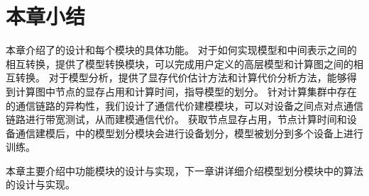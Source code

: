 \section{本章小结}
本章介绍了\sys{}的设计和每个模块的具体功能。
对于如何实现模型和中间表示之间的相互转换，\sys{}提供了模型转换模块，可以完成用户定义的高层模型和计算图之间的相互转换。
对于模型分析，\sys{}提供了显存代价估计方法和计算代价分析方法，能够得到计算图中节点的显存占用和计算时间，指导模型的划分。
针对计算集群中存在的通信链路的异构性，我们设计了通信代价建模模块，可以对设备之间点对点通信链路进行带宽测试，从而建模通信代价。
获取节点显存占用，节点计算时间和设备通信建模后，\sys{}中的模型划分模块会进行设备划分，模型被划分到多个设备上进行训练。

本章主要介绍\sys{}中功能模块的设计与实现，下一章讲详细介绍模型划分模块中的算法的设计与实现。